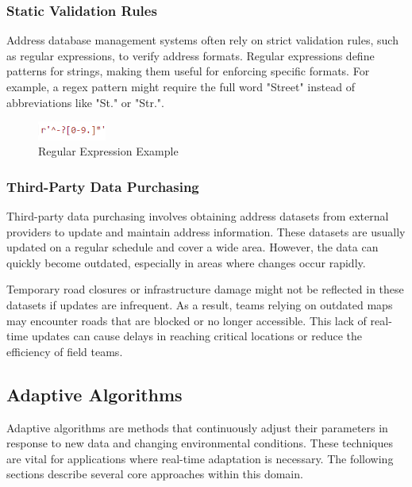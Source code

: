         \subsubsection{Static Validation Rules}
        Address database management systems often rely on strict validation rules, such as regular expressions, to verify address formats. Regular expressions define patterns for strings, making them useful for enforcing specific formats. For example, a regex pattern might require the full word "Street" instead of abbreviations like "St." or "Str.". \autocite{AutorenderWikimedia-Projekte2002Jul}\blankLine


        \begin{figure}[H]
            \centering
            \includegraphics[width=0.2\textwidth]{images/AdminPanel/regexInputFormatter.png}
            \caption{Regular Expression Example}
            \label{fig:regex}
        \end{figure}



        \subsubsection{Third-Party Data Purchasing}
        Third-party data purchasing involves obtaining address datasets from external providers to update and maintain address information. These datasets are usually updated on a regular schedule and cover a wide area. However, the data can quickly become outdated, especially in areas where changes occur rapidly.\blankLine

        Temporary road closures or infrastructure damage might not be reflected in these datasets if updates are infrequent. As a result, teams relying on outdated maps may encounter roads that are blocked or no longer accessible. This lack of real-time updates can cause delays in reaching critical locations or reduce the efficiency of field teams.


    \subsection{Adaptive Algorithms}
    Adaptive algorithms are methods that continuously adjust their parameters in response to new data and changing environmental conditions. These techniques are vital for applications where real-time adaptation is necessary. The following sections describe several core approaches within this domain. \autocite{AdaptiveWikimediaprojects2024Aug}\newpage


